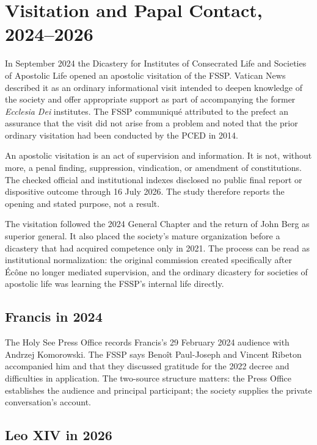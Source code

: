 \section{Visitation and Papal Contact, 2024--2026}

In September 2024 the Dicastery for Institutes of Consecrated Life and Societies of Apostolic Life opened an apostolic visitation of the FSSP. Vatican News described it as an ordinary informational visit intended to deepen knowledge of the society and offer appropriate support as part of accompanying the former \emph{Ecclesia Dei} institutes. The FSSP communiqué attributed to the prefect an assurance that the visit did not arise from a problem and noted that the prior ordinary visitation had been conducted by the PCED in 2014.

An apostolic visitation is an act of supervision and information. It is not, without more, a penal finding, suppression, vindication, or amendment of constitutions. The checked official and institutional indexes disclosed no public final report or dispositive outcome through 16 July 2026. The study therefore reports the opening and stated purpose, not a result.

The visitation followed the 2024 General Chapter and the return of John Berg as superior general. It also placed the society's mature organization before a dicastery that had acquired competence only in 2021. The process can be read as institutional normalization: the original commission created specifically after Écône no longer mediated supervision, and the ordinary dicastery for societies of apostolic life was learning the FSSP's internal life directly.

\subsection{Francis in 2024}

The Holy See Press Office records Francis's 29 February 2024 audience with Andrzej Komorowski. The FSSP says Benoît Paul-Joseph and Vincent Ribeton accompanied him and that they discussed gratitude for the 2022 decree and difficulties in application. The two-source structure matters: the Press Office establishes the audience and principal participant; the society supplies the private conversation's account.

\subsection{Leo XIV in 2026}


